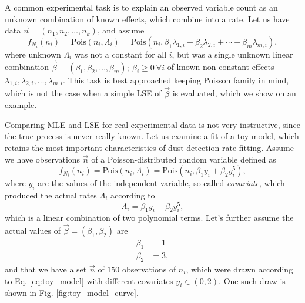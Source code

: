A common experimental task is to explain an observed variable count as an unknown combination of known effects, which combine into a rate. Let us have data $\vec{n} = (n_1, n_2, \dots , n_k)$, and assume
\begin{equation}
    f_{N_i}(n_i) = \mathrm{Pois}(n_i,\Lambda_i) = \mathrm{Pois}(n_i,\beta_1 \lambda_{1,i} + \beta_2 \lambda_{2,i} + \cdots + \beta_m \lambda_{m,i}), \label{eq:linear_comination_model}
\end{equation}
where unknown $\Lambda_i$ was not a constant for all $i$, but was a single unknown linear combination $\vec{\beta} = (\beta_1, \beta_2, \dots, \beta_m); \ \beta_i \geq 0 \ \forall i$ of known non-constant effects $\lambda_{1,i}, \lambda_{2,i}, \dots, \lambda_{m,i}$. This task is best approached keeping Poisson family in mind, which is not the case when a simple LSE of $\vec{\beta}$ is evaluated, which we show on an example. 

Comparing MLE and LSE for real experimental data is not very instructive, since the true process is never really known. Let us examine a fit of a toy model, which retains the most important characteristics of dust detection rate fitting. Assume we have observations $\vec{n}$ of a Poisson-distributed random variable defined as
\begin{equation}
    f_{N_i}(n_i) = \mathrm{Pois}(n_i,\Lambda_i) = \mathrm{Pois}(n_i,\beta_1 y_i + \beta_2 y_i^5), \label{eq:toy_model}
\end{equation}
where $y_i$ are the values of the independent variable, so called \textit{covariate}, which produced the actual rates $\Lambda_i$ according to
\begin{equation}
    \Lambda_i = \beta_1 y_i + \beta_2 y_i^5, \label{eq:toy_model_rate}
\end{equation}
which is a linear combination of two polynomial terms. Let's further assume the actual values of $\vec{\beta} = (\beta_1,\beta_2)$ are
\begin{equation}\begin{split}
    \beta_1 &= 1 \\
    \beta_2 &= 3, \label{eq:toy_beta_values}
\end{split}\end{equation}
and that we have a set $\vec{n}$ of $150$ observations of $n_i$, which were drawn according to Eq. \ref{eq:toy_model} with different covariates $y_i\in(0,2)$. One such draw is shown in Fig. \ref{fig:toy_model_curve}. 

